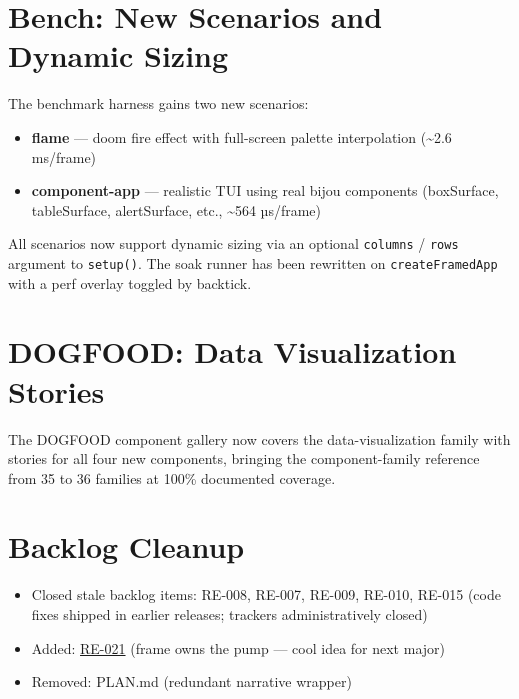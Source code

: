 \section{Bench: New Scenarios and Dynamic Sizing}\label{record-278-bench-new-scenarios-and-dynamic-sizing}

The benchmark harness gains two new scenarios:

\begin{itemize}
\tightlist
\item
  \textbf{flame} --- doom fire effect with full-screen palette interpolation (\textasciitilde2.6 ms/frame)
\item
  \textbf{component-app} --- realistic TUI using real bijou components (boxSurface, tableSurface, alertSurface, etc., \textasciitilde564 µs/frame)
\end{itemize}

All scenarios now support dynamic sizing via an optional \texttt{c\allowbreak{}o\allowbreak{}l\allowbreak{}u\allowbreak{}m\allowbreak{}n\allowbreak{}s} / \texttt{r\allowbreak{}o\allowbreak{}w\allowbreak{}s} argument to \texttt{s\allowbreak{}e\allowbreak{}t\allowbreak{}u\allowbreak{}p\allowbreak{}(\allowbreak{})}. The soak runner has been rewritten on \texttt{c\allowbreak{}r\allowbreak{}e\allowbreak{}a\allowbreak{}t\allowbreak{}e\allowbreak{}F\allowbreak{}r\allowbreak{}a\allowbreak{}m\allowbreak{}e\allowbreak{}d\allowbreak{}A\allowbreak{}p\allowbreak{}p} with a perf overlay toggled by backtick.

\section{DOGFOOD: Data Visualization Stories}\label{record-278-dogfood-data-visualization-stories}

The DOGFOOD component gallery now covers the data-visualization family with stories for all four new components, bringing the component-family reference from 35 to 36 families at 100\% documented coverage.

\section{Backlog Cleanup}\label{record-278-backlog-cleanup}

\begin{itemize}
\tightlist
\item
  Closed stale backlog items: RE-008, RE-007, RE-009, RE-010, RE-015 (code fixes shipped in earlier releases; trackers administratively closed)
\item
  Added: \href{https://github.com/flyingrobots/bijou/blob/cbd70612140e7a450d764b3c7be1c6af878b99bc/docs/method/backlog/cool-ideas/RE-021-frame-owns-the-pump.md}{RE-021} (frame owns the pump --- cool idea for next major)
\item
  Removed: PLAN.md (redundant narrative wrapper)
\end{itemize}

